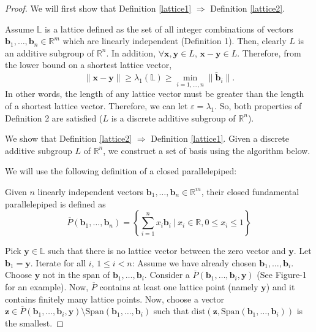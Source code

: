 \begin{proof}
    We will first show that Definition \ref*{lattice1} $\Rightarrow$ Definition \ref*{lattice2}.

    Assume $\mathbb{L}$ is a lattice defined as the set of all integer combinations of vectors $\mathbf{b}_1, \ldots, \mathbf{b}_n \in \mathbb{R}^m$ which are linearly independent (Definition 1). Then, clearly $L$ is an additive subgroup of $\mathbb{R}^n$. In addition, $\forall \mathbf{x}, \mathbf{y} \in L$, $\mathbf{x} - \mathbf{y} \in L$. Therefore, from the lower bound on a shortest lattice vector, 
    $$\|\mathbf{x} - \mathbf{y}\| \geq \lambda_1(\mathbb{L}) \geq \min_{i=1,\ldots,n} \|\tilde{\mathbf{b}}_i\|.$$
    In other words, the length of any lattice vector must be greater than the length of a shortest lattice vector.
    Therefore, we can let $\varepsilon = \lambda_1$. So, both properties of Definition 2 are satisfied ($L$ is a discrete additive subgroup of $\mathbb{R}^n$).
    
    We show that Definition \ref*{lattice2} $\Rightarrow$ Definition \ref*{lattice1}. Given a discrete additive subgroup $L$ of $\mathbb{R}^n$, we construct a set of basis using the algorithm below.
    
    We will use the following definition of a closed parallelepiped:
    
    Given \(n\) linearly independent vectors \(\mathbf{b}_1, \ldots, \mathbf{b}_n \in \mathbb{R}^m\), their closed fundamental parallelepiped is defined as
\[
\overline{P}(\mathbf{b}_1, \ldots, \mathbf{b}_n) = \left\{ \sum_{i=1}^{n} x_i \mathbf{b}_i \ \bigg| \ x_i \in \mathbb{R}, 0 \leq x_i \leq 1 \right\}
\]

Pick \(\mathbf{y} \in \mathbb{L}\) such that there is no lattice vector between the zero vector and \(\mathbf{y}\). Let \(\mathbf{b}_1 = \mathbf{y}\).
Iterate for all \(i\), \(1 \leq i < n\): Assume we have already chosen \(\mathbf{b}_1, \ldots, \mathbf{b}_i\). Choose \(\mathbf{y}\) not in the span of \(\mathbf{b}_1, \ldots, \mathbf{b}_i\).
Consider a \(\overline{P}(\mathbf{b}_1, \ldots, \mathbf{b}_i, \mathbf{y})\) (See Figure-1 for an example).
Now, \(\overline{P}\) contains at least one lattice point (namely \(\mathbf{y}\)) and it contains finitely many lattice points. Now, choose a vector \(\mathbf{z} \in \overline{P}(\mathbf{b}_1, \ldots, \mathbf{b}_i, \mathbf{y}) \setminus \text{Span}(\mathbf{b}_1, \ldots, \mathbf{b}_i)\) such that \(\text{dist}(\mathbf{z}, \text{Span}(\mathbf{b}_1, \ldots, \mathbf{b}_i))\) is the smallest.


\end{proof}
